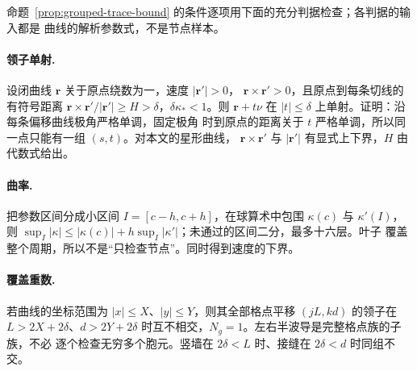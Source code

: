 命题~\ref{prop:grouped-trace-bound} 的条件逐项用下面的充分判据检查；各判据的输入都是
曲线的解析参数式，不是节点样本。

\paragraph{领子单射.}
设闭曲线 $\boldsymbol r$ 关于原点绕数为一，速度 $|\boldsymbol r'|>0$，
$\boldsymbol r\times\boldsymbol r'>0$，且原点到每条切线的有符号距离
$\boldsymbol r\times\boldsymbol r'/|\boldsymbol r'|\geq H>\delta$，$\delta\kappa_*<1$。则
$\boldsymbol r+t\nu$ 在 $|t|\leq\delta$ 上单射。证明：沿每条偏移曲线极角严格单调，固定极角
时到原点的距离关于 $t$ 严格单调，所以同一点只能有一组 $(s,t)$。对本文的星形曲线，
$\boldsymbol r\times\boldsymbol r'$ 与 $|\boldsymbol r'|$ 有显式上下界，$H$ 由代数式给出。

\paragraph{曲率.}
把参数区间分成小区间 $I=[c-h,c+h]$，在球算术中包围 $\kappa(c)$ 与 $\kappa'(I)$，则
$\sup_I|\kappa|\leq|\kappa(c)|+h\sup_I|\kappa'|$；未通过的区间二分，最多十六层。叶子
覆盖整个周期，所以不是“只检查节点”。同时得到速度的下界。

\paragraph{覆盖重数.}
若曲线的坐标范围为 $|x|\leq X$、$|y|\leq Y$，则其全部格点平移 $(jL,kd)$ 的领子在
$L>2X+2\delta$、$d>2Y+2\delta$ 时互不相交，$N_g=1$。左右半波导是完整格点族的子族，不必
逐个检查无穷多个胞元。竖墙在 $2\delta<L$ 时、接缝在 $2\delta<d$ 时同组不交。

